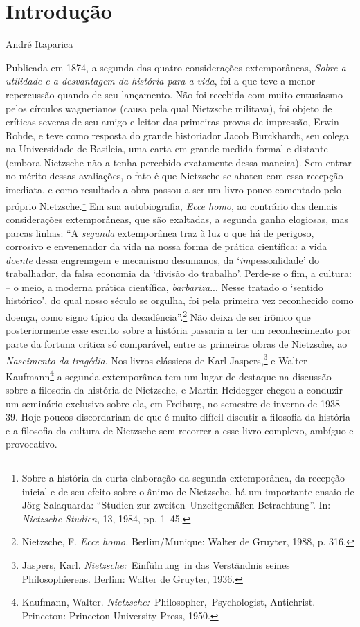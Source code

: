 \chapter{Introdução}{}{André Itaparica}\label{introduuxe7uxe3o}


Publicada em 1874, a segunda das quatro considerações extemporâneas,
\emph{Sobre a utilidade e a desvantagem da história para a vida}, foi a
que teve a menor repercussão quando de seu lançamento. Não foi recebida
com muito entusiasmo pelos círculos wagnerianos (causa pela qual
Nietzsche militava), foi objeto de críticas severas de seu amigo e
leitor das primeiras provas de impressão, Erwin Rohde, e teve como
resposta do grande historiador Jacob Burckhardt, seu colega na
Universidade de Basileia, uma carta em grande medida formal e distante
(embora Nietzsche não a tenha percebido exatamente dessa maneira). Sem
entrar no mérito dessas avaliações, o fato é que Nietzsche se abateu com
essa recepção imediata, e como resultado a obra passou a ser um livro
pouco comentado pelo próprio Nietzsche.\footnote{Sobre a história da
  curta elaboração da segunda extemporânea, da recepção inicial e de seu
  efeito sobre o ânimo de Nietzsche, há um importante ensaio de Jörg
  Salaquarda: ``Studien zur zweiten~Unzeitgemäßen Betrachtung''. In:
  \emph{Nietzsche-Studien}, 13, 1984, pp. 1--45.} Em sua autobiografia,
\emph{Ecce homo}, ao contrário das demais considerações extemporâneas,
que são exaltadas, a segunda ganha elogiosas, mas parcas linhas: ``A
\emph{segunda} extemporânea traz à luz o que há de perigoso, corrosivo e
envenenador da vida na nossa forma de prática científica: a vida
\emph{doente} dessa engrenagem e mecanismo desumanos, da
`\emph{im}pessoalidade' do trabalhador, da falsa economia da `divisão
do trabalho'. Perde-se o fim, a cultura: -- o meio, a moderna prática
científica, \emph{barbariza}... Nesse tratado o `sentido histórico', do
qual nosso século se orgulha, foi pela primeira vez reconhecido como
doença, como signo típico da decadência''.\footnote{Nietzsche, F.
  \emph{Ecce homo.} Berlim/Munique: Walter de Gruyter, 1988, p. 316.}
Não deixa de ser irônico que posteriormente esse escrito sobre a
história passaria a ter um reconhecimento por parte da fortuna crítica
só comparável, entre as primeiras obras de Nietzsche, ao
\emph{Nascimento da tragédia}. Nos livros clássicos de Karl
Jaspers,\footnote{Jaspers, Karl. \emph{Nietzsche:}~Einführung~in das 
Verständnis seines Philosophierens. Berlim: Walter de Gruyter, 1936.} 
e Walter Kaufmann\footnote{Kaufmann, Walter.
  \emph{Nietzsche:}~Philosopher,~Psychologist,
  Antichrist. Princeton: Princeton University Press, 1950.} a
segunda extemporânea tem um lugar de destaque na discussão sobre a
filosofia da história de Nietzsche, e Martin Heidegger chegou a conduzir
um seminário exclusivo sobre ela, em Freiburg, no semestre de inverno de
1938--39. Hoje poucos discordariam de que é muito difícil discutir a
filosofia da história e a filosofia da cultura de Nietzsche sem recorrer
a esse livro complexo, ambíguo e provocativo.

